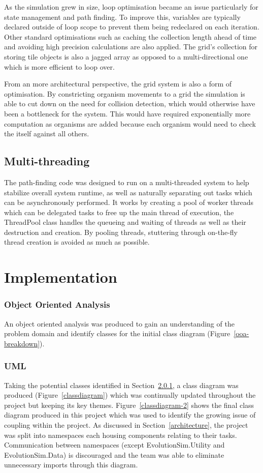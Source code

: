 \documentclass[a4paper, oneside, 11pt]{report}
\begin{document}
As the simulation grew in size, loop optimisation became an issue particularly for state management and path finding. To improve this, variables are typically declared outside of loop scope to prevent them being redeclared on each iteration. Other standard optimisations such as caching the collection length ahead of time and avoiding high precision calculations are also applied. The grid's collection for storing tile objects is also a jagged array as opposed to a multi-directional one which is more efficient to loop over.

From an more architectural perspective, the grid system is also a form of optimisation. By constricting organism movements to a grid the simulation is able to cut down on the need for collision detection, which would otherwise have been a bottleneck for the system. This would have required exponentially more computation as organisms are added because each organism would need to check the itself against all others.

\section{Multi-threading} \label{multithreading}
The path-finding code was designed to run on a multi-threaded system to help stabilize overall system runtime, as well as naturally separating out tasks which can be asynchronously performed. It works by creating a pool of worker threads which can be delegated tasks to free up the main thread of execution, the ThreadPool class handles the queueing and waiting of threads as well as their destruction and creation. By pooling threads, stuttering through on-the-fly thread creation is avoided as much as possible.

\chapter{Implementation} \label{implementation}

\subsection{Object Oriented Analysis}\label{ooa}
An object oriented analysis was produced to gain an understanding of the problem domain and identify classes for the initial class diagram (Figure~\ref{ooa-breakdown}).

\subsection{UML}\label{uml}
Taking the potential classes identified in Section~\ref{ooa}, a class diagram was produced (Figure~\ref{classdiagram}) which was continually updated throughout the project but keeping its key themes. Figure~\ref{classdiagram-2} shows the final class diagram produced in this project which was used to identify the growing issue of coupling within the project. As discussed in Section~\ref{architecture}, the project was split into namespaces each housing components relating to their tasks. Communication between namespaces (except EvolutionSim.Utility and EvolutionSim.Data) is discouraged and the team was able to eliminate unnecessary imports through this diagram.
\end{document}
